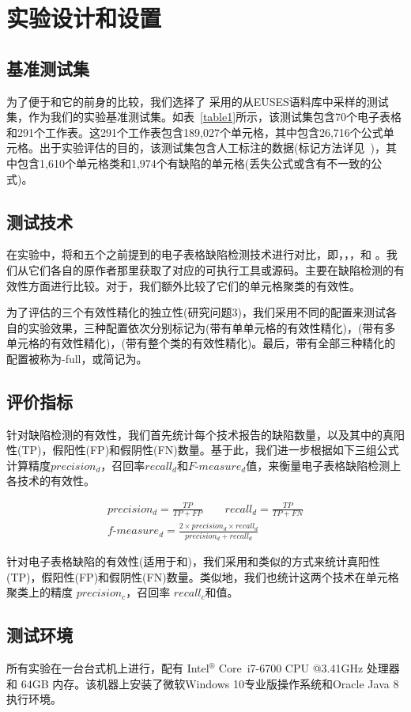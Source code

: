 \section{实验设计和设置}



\subsection{基准测试集} 

为了便于\wa 和它的前身\cu 的比较，我们选择了 \cu 采用的从EUSES语料库中采样的测试集，作为我们的实验基准测试集。如表~\ref{table1}所示，该测试集包含70个电子表格和291个工作表。这291个工作表包含189,027个单元格，其中包含26,716个公式单元格。出于实验评估的目的，该测试集包含人工标注的数据(标记方法详见~\cite{cheung2016custodes})，其中包含1,610个单元格类和1,974个有缺陷的单元格(丢失公式或含有不一致的公式)。

\subsection{测试技术} 

在实验中，\wa 将和五个之前提到的电子表格缺陷检测技术进行对比，即\uc，\di，\am，\ca 和 \cu。我们从它们各自的原作者那里获取了对应的可执行工具或源码。主要在缺陷检测的有效性方面进行比较。对于\ca，我们额外比较了它们的单元格聚类的有效性。

为了评估的三个有效性精化的独立性(研究问题3)，我们采用不同的配置来测试各自的实验效果，三种配置依次分别标记为\wasc (带有单单元格的有效性精化)，\wamc (带有多单元格的有效性精化)，\wawc (带有整个类的有效性精化)。最后，带有全部三种精化的配置被称为\wa-full，或简记为\wa。

\subsection{评价指标} 

针对缺陷检测的有效性，我们首先统计每个技术报告的缺陷数量，以及其中的真阳性(TP)，假阳性(FP)和假阴性(FN)数量。基于此，我们进一步根据如下三组公式计算精度$precision_d$，召回率$recall_d$和$F\text{-}measure_d$值，来衡量电子表格缺陷检测上各技术的有效性。

\begin{gather*}
    precision_d=\frac{TP}{TP + FP}\qquad recall_d = \frac{TP}{TP + FN}\\
    f\text{-}measure_d = \frac{2 \times precision_d \times recall_d}{precision_d + recall_d}
\end{gather*}

针对电子表格缺陷的有效性(适用于\wa 和\cu )，我们采用和\cu 类似的方式来统计真阳性(TP)，假阳性(FP)和假阴性(FN)数量。类似地，我们也统计这两个技术在单元格聚类上的精度 $precision_c$，召回率 $recall_c$和\fmc 值。

\subsection{测试环境} 

所有实验在一台台式机上进行，配有 Intel$^\circledR$ Core\texttrademark\ i7-6700 CPU @3.41GHz 处理器和 64GB 内存。该机器上安装了微软Windows 10专业版操作系统和Oracle Java 8执行环境。

